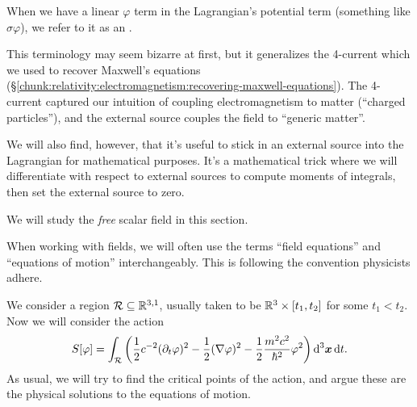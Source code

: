 \begin{definition}
When we have a linear $\varphi$ term in the Lagrangian's potential term
(something like $\sigma\varphi$), we refer to it as an
.
\end{definition}

\begin{remark}
This terminology may seem bizarre at first, but it generalizes the
4-current which we used to recover Maxwell's equations (\S\ref{chunk:relativity:electromagnetism:recovering-maxwell-equations}).
The 4-current captured our intuition of coupling electromagnetism to
matter (``charged particles''), and the external source couples the
field to ``generic matter''.

We will also find, however, that it's useful to stick in an external
source into the Lagrangian for mathematical purposes. It's a
mathematical trick where we will differentiate with respect to external
sources to compute moments of integrals, then set the external source to
zero. 
\end{remark}

We will study the \emph{free} scalar field in this section. 

When working with fields, we will often use the terms ``field
equations'' and ``equations of motion'' interchangeably. This is
following the convention physicists adhere.

We consider a region $\mathcal{R}\subseteq\mathbb{R}^{3,1}$, usually taken to be
$\mathbb{R}^{3}\times[t_{1},t_{2}]$ for some $t_{1}<t_{2}$. Now we will
consider the action
\begin{equation}
S[\varphi] = \int_{\mathcal{R}}\left(\frac{1}{2}c^{-2}(\partial_{t}\varphi)^{2}-\frac{1}{2}(\nabla\varphi)^{2}
-\frac{1}{2}\frac{m^{2}c^{2}}{\hbar^{2}}\varphi^{2}\right)\mathrm{d}^{3}\boldsymbol{x}\,\mathrm{d} t.
\end{equation}
As usual, we will try to find the critical points of the action, and
argue these are the physical solutions to the equations of motion.

